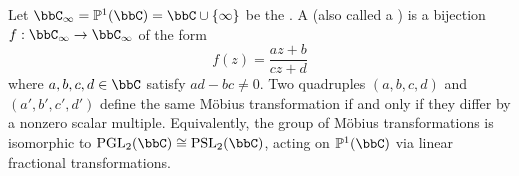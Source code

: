 \begin{definition} \label{definition:mobius_transformation_linear_fractional_transformation}
    Let $\bbC_\infty = \mathbb{P}^1(\bbC) = \bbC \cup \{\infty\}$ be the . A  (also called a ) is a bijection $f : \bbC_\infty \to \bbC_\infty$ of the form
    $$f(z) = \frac{az + b}{cz + d}$$
    where $a, b, c, d \in \bbC$ satisfy $ad - bc \neq 0$. Two quadruples $(a,b,c,d)$ and $(a',b',c',d')$ define the same Möbius transformation if and only if they differ by a nonzero scalar multiple. Equivalently, the group of Möbius transformations is isomorphic to $\operatorname{PGL}_2(\bbC) \cong \operatorname{PSL}_2(\bbC)$, acting on $\mathbb{P}^1(\bbC)$ via linear fractional transformations.
\end{definition}
